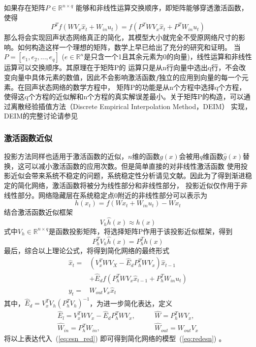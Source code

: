 如果存在矩阵\(P \in \mathbb{R}^{n \times q}\) 能够和非线性运算交换顺序，即矩阵能够穿透激活函数，使得
\begin{equation}
	P^T f(W V_x  \widehat{x}_t + W_{in} u_t) = f(P^T W V_x \widehat{x}_t + P^T W_{in} u_t)	
\end{equation}
那么将会实现回声状态网络真正的简化，其模型大小就完全不受原网络尺寸的影响。如何构造这样一个理想的矩阵，数学上早已给出了充分的研究和证明。
当\(P = [e_1,e_2,...,e_q]\) (\(e \in \mathbb{R}^n\)是只含一个1且其余元素为0的向量)，线性运算和非线性运算可以交换顺序。其原理在于矩阵P的
运算只是从n行向量中选出q行，不会改变向量中具体元素的数值，因此不会影响激活函数\(f\)独立的应用到向量的每一个元素。在回声状态网络的数学方程中，
矩阵P的功能是从n个方程中选择q个方程，使得这q个方程的近似解和n个方程的真实解误差最小。关于矩阵P的构造，可以通过离散经验插值方法（Discrete Empirical Interpolation Method，DEIM）
实现，DEIM的完整讨论请参见\cite{DEIM}

\subsubsection{激活函数近似}
投影方法同样也适用于激活函数的近似，\(n\)维的函数\(g(x)\)会被用\(q\)维函数\(\widehat{g}(x)\)替换，这可以减小激活函数的应用次数。但是简单直接的对非线性激活函数
使用投影近似会带来系统不稳定的问题，系统稳定性分析请见文献\cite{WangLong:TNNLS'23}。因此为了得到渐进稳定的简化网络，激活函数将被分为线性部分和非线性部分，
投影近似仅作用于非线性部分。网络隐藏层在系统稳定点0附近的非线性部分可以表示为
\begin{equation}\label{eq:h(x)}
	h(x_t) = f(W x_t + W_{in} u_t) - W x_t
\end{equation}
结合激活函数近似框架
\begin{equation}
	V_h \widehat{h}(x) \approx h(x)
\end{equation}
式中\(V_h \in \mathbb{R}^{n \times q}\)是函数投影矩阵，将选择矩阵P作用于该投影近似框架，得到
\begin{equation}\label{eq:Pselect}
	P_h^T V_h \widehat{h}(x) = P_h^T h(x)
\end{equation}
最后，综合以上理论公式，将得到简化网络的最终形式
\begin{equation}\label{eq:esn_red}
	\begin{split}
		\widehat{x}_t  = &(V_x^T W V_X - \widehat{E}_d P_h^T W V_x)\widehat{x}_{t-1}  \\
					     & + \widehat{E}_{d} f(P_h^T W V_x \widehat{x}_{t-1} + P_h^{T} W_{in} u_{t})	\\
				y_t    = &W_{out} V_x \widehat{x}_t
	\end{split}
\end{equation}
其中，\(\widehat{E}_d = V_x^T V_h (P_h^TV_h)^{-1}\)，为进一步简化表达，定义
\begin{equation}
	\begin{split}
		\widehat{E}_l = V_x^T W V_x - \widehat{E}_d P_h^T W V_x,	\qquad &\widehat{W} = P_h^T W V_x,		\\
		\widehat{W}_{in} = P_h^T W_{in},							\qquad &\widehat{W}_{out} = W_{out}V_x
	\end{split}
\end{equation}
将以上表达代入~(\ref{eq:esn_red}) 即可得到简化网络的模型~(\ref{eq:redesn}) 。

